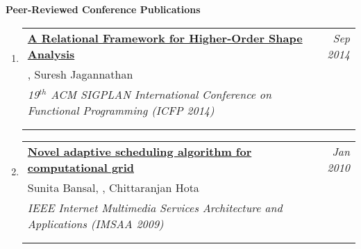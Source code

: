 \documentclass{article}
\makeatletter
\newenvironment{benumerate}[2]{
    \let\oldItem\item
    \def\item{\addtocounter{enumi}{-2}\oldItem}
    \begin{enumerate}[#2] \itemsep3pt
    \setcounter{enumi}{#1}
    \addtocounter{enumi}{1}}
  {\end{enumerate}}
\newenvironment{region}[3]{%
  {{\textbf{#1}}}
  \begin{benumerate}{#3}{\color{RoyalBlue}#2}}
  {\end{benumerate}\vspace{0.8ex}}
\newenvironment{publication}[6]
{ \item
  \begin{tabular*}{6.8in}{p{6in}@{\extracolsep{\fill}}r}
    \href{#1}{\textbf{#2}} & \textit{#3}\\ #4 &\\ \textit{#5}&\\
    \ifthenelse{\equal{#6}{}}{}{#6&\\}
  \end{tabular*}
} {}
\makeatother
\begin{document}
\begin{region} {Peer-Reviewed Conference Publications}{{C}1}{7}
  \begin{publication}{https://gowthamk.github.io/docs/icfp2014.pdf}
    {A Relational Framework for Higher-Order Shape Analysis}
    {Sep 2014}{\ugkaki, Suresh Jagannathan}
    {19$^{th}$ ACM SIGPLAN  International Conference on Functional Programming (ICFP 2014)}
    {Pages 413 - 424 (double column); Accceptance rate: 29\%}
  \end{publication}

  \begin{publication}{https://www.researchgate.net/publication/224127688_Novel_adaptive_scheduling_algorithm_for_computational_grid}
    {Novel adaptive scheduling algorithm for computational grid}
    {Jan 2010}{Sunita Bansal, \ugkaki, Chittaranjan Hota}
    {IEEE Internet Multimedia Services Architecture and Applications (IMSAA
    2009)}
    {Pages: 11:1 - 11:5; Acceptance rate unknown}
  \end{publication}

\end{region}
\end{document}
